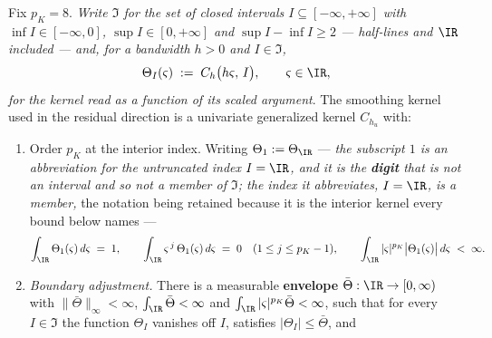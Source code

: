\begin{assumption}\label{ass:app3}
Fix $p_K=8$. \emph{Write $\mathfrak I$ for the set of closed intervals $I\subseteq[-\infty,+\infty]$
with $\inf I\in[-\infty,0]$, $\sup I\in[0,+\infty]$ and $\sup I-\inf I\ge2$ --- half-lines and $\IR$
included --- and, for a bandwidth $h>0$ and $I\in\mathfrak I$,}
\begin{equation}\label{eq:rescaled}
\Theta_I(\varsigma)\;:=\;C_{h}\big(h\varsigma,\,I\big),
\qquad\varsigma\in\IR,
\end{equation}
\emph{for the kernel read as a function of its scaled argument}. The smoothing kernel used in the residual
direction is a univariate generalized kernel $C_{h_u}$ with:
\begin{enumerate}
\item[(i)] Order $p_K$ at the interior index. Writing $\Theta_1:=\Theta_{\IR}$ --- \emph{the subscript
$1$ is an abbreviation for the untruncated index $I=\IR$, and it is the \textbf{digit} that is not an
interval and so not a member of $\mathfrak I$; the index it abbreviates, $I=\IR$, is a member,} the
notation being retained because it is the interior kernel every bound below names ---
\[
\int_{\IR}\Theta_1(\varsigma)\,d\varsigma\;=\;1,
\qquad
\int_{\IR}\varsigma^{\,j}\,\Theta_1(\varsigma)\,d\varsigma\;=\;0
\quad (1\le j\le p_K-1),
\qquad
\int_{\IR}|\varsigma|^{p_K}\big|\Theta_1(\varsigma)\big|\,d\varsigma\;<\;\infty .
\]
\item[(ii)] \emph{Boundary adjustment.} There is a measurable \textbf{envelope}
$\bar\Theta:\IR\to[0,\infty)$ with $\|\bar\Theta\|_\infty<\infty$, $\int_\IR\bar\Theta<\infty$ and
$\int_\IR|\varsigma|^{p_K}\bar\Theta<\infty$, such that for every $I\in\mathfrak I$ the function
$\Theta_{I}$ vanishes off $I$, satisfies $|\Theta_I|\le\bar\Theta$, and
\begin{equation}\label{eq:truncmom}

\end{equation}
\end{enumerate}
\end{assumption}
